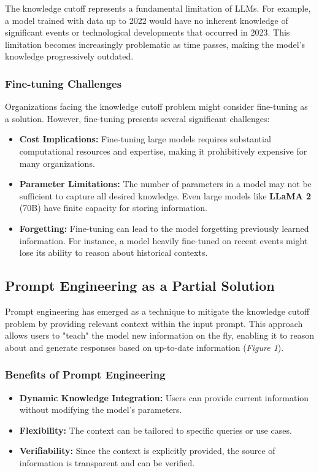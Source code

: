 \documentclass[12pt]{article}
\begin{document}
    The knowledge cutoff represents a fundamental limitation of LLMs. For example, a model 
    trained with data up to 2022 would have no inherent knowledge of significant events or 
    technological developments that occurred in 2023. This limitation becomes increasingly 
    problematic as time passes, making the model's knowledge progressively outdated.
    
    \subsubsection{Fine-tuning Challenges}
    
    Organizations facing the knowledge cutoff problem might consider fine-tuning as a solution. 
    However, fine-tuning presents several significant challenges:

    \begin{itemize}
        \item \textbf{Cost Implications:} Fine-tuning large models requires substantial 
        computational resources and expertise, making it prohibitively expensive for many organizations.

        \item \textbf{Parameter Limitations:} The number of parameters in a model may not be 
        sufficient to capture all desired knowledge. Even large models like \textbf{LLaMA 2} (70B) 
        have finite capacity for storing information.

        \item \textbf{Forgetting:} Fine-tuning can lead to the model forgetting previously learned 
        information. For instance, a model heavily fine-tuned on recent events might lose its ability
        to reason about historical contexts.
    \end{itemize}

    \subsection{Prompt Engineering as a Partial Solution}
    Prompt engineering has emerged as a technique to mitigate the knowledge cutoff problem by 
    providing relevant context within the input prompt. This approach allows users to "teach" 
    the model new information on the fly, enabling it to reason about and generate responses 
    based on up-to-date information (\textit{Figure 1}).

    \subsubsection{Benefits of Prompt Engineering}
    \begin{itemize}
    \item \textbf{Dynamic Knowledge Integration:} Users can provide current information without 
    modifying the model's parameters.
    \item \textbf{Flexibility:} The context can be tailored to specific queries or use cases.
    \item \textbf{Verifiability:} Since the context is explicitly provided, the source of 
    information is transparent and can be verified.
    \end{itemize}
\end{document}
